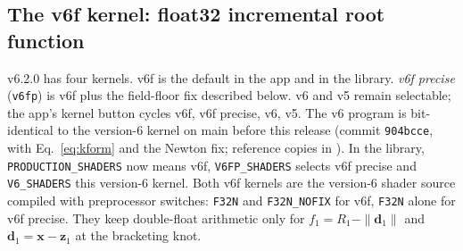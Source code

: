 \documentclass[11pt, a4paper]{article}
\begin{document}
\subsection{The v6f kernel: float32 incremental root function}\label{sec:v6f}
v6.2.0 has four kernels. v6f is the default in the app and in the library. \emph{v6f precise} (\texttt{v6fp}) is v6f plus the field-floor fix described below. v6 and v5 remain selectable; the app's kernel button cycles v6f, v6f precise, v6, v5. The v6 program is bit-identical to the version-6 kernel on main before this release (commit \texttt{904bcce}, with Eq.~\eqref{eq:kform} and the Newton fix; reference copies in ). In the library, \texttt{PRODUCTION\_SHADERS} now means v6f, \texttt{V6FP\_SHADERS} selects v6f precise and \texttt{V6\_SHADERS} this version-6 kernel. Both v6f kernels are the version-6 shader source compiled with preprocessor switches: \texttt{F32N} and \texttt{F32N\_NOFIX} for v6f, \texttt{F32N} alone for v6f precise. They keep double-float arithmetic only for $f_1 = R_1 - \|\mathbf{d}_1\|$ and $\mathbf{d}_1 = \mathbf{x} - \mathbf{z}_1$ at the bracketing knot.
\end{document}
